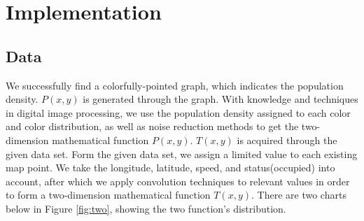 \documentclass{mcmthesis}
\begin{document}
\section{Implementation}\label{sec:impl}

\subsection{Data}
We successfully find a colorfully-pointed graph, which indicates the population density. $P(x,y)$ is generated through the graph. With knowledge and techniques in digital image processing, we use the population density assigned to each color and color distribution, as well as noise reduction methods to get the two-dimension mathematical function $P(x,y)$. $T(x,y)$ is acquired through the given data set. Form the given data set, we assign a limited value to each existing map point. We take the longitude, latitude, speed, and status(occupied) into account, after which we apply convolution techniques to relevant values in order to form a two-dimension mathematical function $T(x,y)$. There are two charts below in Figure \ref{fig:two}, showing the two function's distribution.
\end{document}

